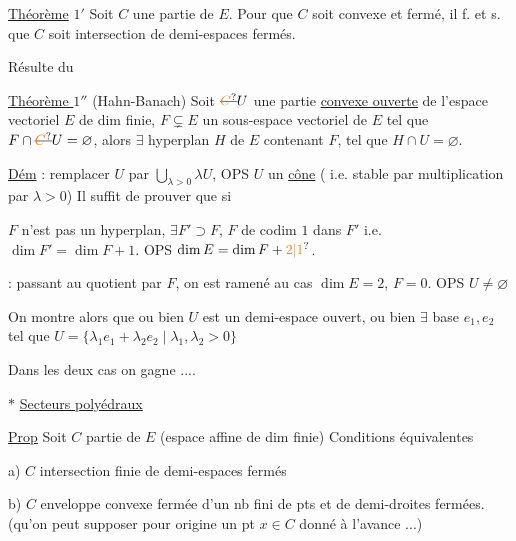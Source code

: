 
\uline{Théorème} $1'$ Soit $C$ une partie de $E$. Pour que $C$ soit convexe et fermé, il f. et s. que $C$ soit intersection de demi-espaces fermés.

Résulte du

\uline{Théorème $1''$} (Hahn-Banach) Soit $\deleted{\unsure{C}}U$ une partie \uline{convexe ouverte} de l'espace vectoriel  $E$ de dim finie, $F\subsetneq E$ un sous-espace vectoriel de $E$ tel que $F\cap\deleted{\unsure{C}}U=\varnothing$, alors $\exists$ hyperplan $H$ de $E$ contenant $F$, tel que $H\cap U=\varnothing$.


 \uline{Dém}  : remplacer $U$ par $\bigcup_{\lambda>0}\lambda U$, OPS $U$ un \uline{cône} ( i.e. stable par multiplication par $\lambda>0$) Il suffit de prouver que si

$F$ n'est pas un hyperplan, $\exists F'\supset F$, $F$ de codim $1$ dans $F'$ i.e. $\dim F'=\dim F+1$. OPS $\dim E=\dim F+\unsure{2|1}$.

 : passant au quotient par $F$, on est ramené au cas $\dim E=2$, $F=0$. OPS $U\ne\varnothing$

On montre alors que ou bien $U$ est un demi-espace ouvert, ou bien $\exists$ base $e_1,e_2$ tel que $U=\{\lambda_1 e_1+\lambda_2 e_2\mid\lambda_1,\lambda_2>0\}$


Dans les deux cas on gagne ....


$\ast$ \uline{Secteurs polyédraux}

\uline{Prop} Soit $C$ partie de $E$ (espace affine de dim finie) Conditions équivalentes

a) $C$ intersection finie de demi-espaces fermés

b) $C$ enveloppe convexe fermée d'un nb fini de pts et de demi-droites fermées. (qu'on peut supposer  pour origine un pt $x\in C$ donné à l'avance ...)

